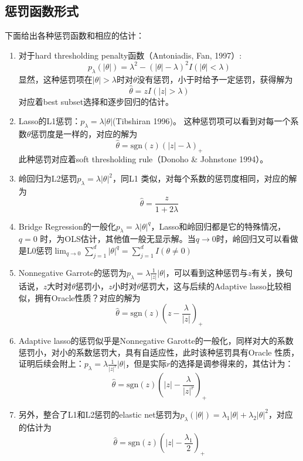 ﻿\documentclass[hyperref,12pt]{ctexart}
\begin{document}
\subsection{惩罚函数形式}
下面给出各种惩罚函数和相应的估计：
\begin{enumerate}[(1)]
	\item 对于hard thresholding penalty函数（Antoniadis, Fan, 1997）:
	$$p_{\lambda}(|\theta|) = \lambda^2 - (|\theta| - \lambda)^2 I(|\theta| < \lambda)$$
	显然，这种惩罚项在$|\theta| > \lambda$时对$\theta$没有惩罚，小于时给予一定惩罚，获得解为
	$$\hat{\theta} = zI(|z| > \lambda)$$
	对应着best subset选择和逐步回归的估计。
	
	\item Lasso的L1惩罚：$p_{\lambda} = \lambda|\theta|$(Tibshiran 1996)。
	这种惩罚项可以看到对每一个系数$\theta$惩罚度是一样的，对应的解为
	$$\hat{\theta} = \text{sgn}(z)(|z| - \lambda)_{+}$$
	此种惩罚对应着soft thresholding rule（Donoho \& Johnstone 1994）。
	
	\item 岭回归为L2惩罚$p_{\lambda} = \lambda|\theta|^2$，同L1 类似，对每个系数的惩罚度相同，对应的解为
	$$\hat{\theta} = \frac{z}{1 + 2\lambda}$$
	\item Bridge Regression的一般化$p_{\lambda} = \lambda|\theta|^q$，Lasso和岭回归都是它的特殊情况，$q = 0$ 时，为OLS估计，其他值一般无显示解。当$q \rightarrow 0$时，岭回归又可以看做是L0惩罚$\lim_{q \rightarrow 0}\sum^d_{j = 1}|\theta|^q  = \sum^d_{j = 1}I(\theta \neq 0) $
	
	\item Nonnegative Garrote的惩罚为$p_{\lambda} = \lambda\frac{1}{|z|}|\theta|$，可以看到这种惩罚与$z$有关，换句话说，$z$大时对$\theta$惩罚小，$z$小时对$\theta$惩罚大，这与后续的Adaptive lasso比较相似，拥有Oracle性质？对应的解为
	$$\hat{\theta} = \text{sgn}(z)(z - \frac{\lambda}{|z|})_+$$
	
	\item Adaptive lasso的惩罚似乎是Nonnegative Garotte的一般化，同样对大的系数惩罚小，对小的系数惩罚大，具有自适应性，此时该种惩罚具有Oracle 性质，证明后续会附上：$p_{\lambda} = \lambda\frac{1}{|z|^r}|\theta|$，但是实际$r$的选择是调参得来的，其估计为：
	$$\hat{\theta} = \text{sgn}(z)(|z| - \frac{\lambda}{|z|^r})_+$$
	
	\item 另外，整合了L1和L2惩罚的elastic net惩罚为$p_{\lambda}(|\theta|) = \lambda_1|\theta| + \lambda_2|\theta|^2$，对应的估计为
	$$\hat{\theta} = \text{sgn}(z)(|z| - \frac{\lambda_1}{2})_+$$
	

\end{enumerate}
\end{document}
